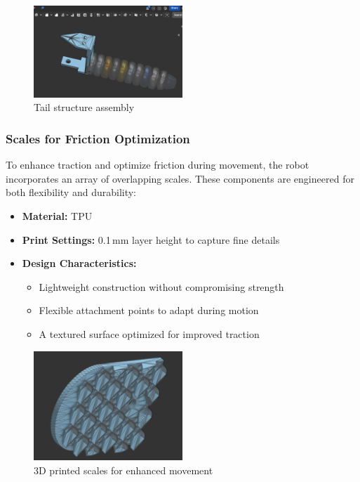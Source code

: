 \documentclass[12pt,a4paper]{report}
\begin{document}
\begin{figure}[H]
\centering
\includegraphics[width=0.5\textwidth]{media/Tail-part.png}
\caption{Tail structure assembly}
\end{figure}

\FloatBarrier
\subsubsection{Scales for Friction Optimization}
To enhance traction and optimize friction during movement, the robot incorporates an array of overlapping scales. These components are engineered for both flexibility and durability:
\begin{itemize}
    \item \textbf{Material:} TPU
    \item \textbf{Print Settings:} 0.1\,mm layer height to capture fine details
    \item \textbf{Design Characteristics:}
    \begin{itemize}
        \item Lightweight construction without compromising strength
        \item Flexible attachment points to adapt during motion
        \item A textured surface optimized for improved traction
    \end{itemize}
\end{itemize}

\begin{figure}[H]
\centering
\includegraphics[width=0.5\textwidth]{media/scales.png}
\caption{3D printed scales for enhanced movement}
\end{figure}
\end{document}

